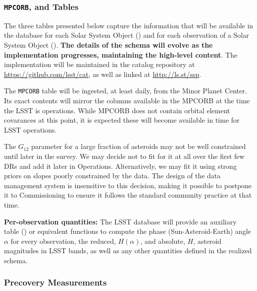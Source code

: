 \subsubsection{{\tt MPCORB}, \SSObject and \SSSource Tables}

The three tables presented below capture the information that will be available in the database for each Solar System Object (\SSObject) and for each observation of a Solar System Object (\SSSource). {\bf The details of the schema will evolve as the implementation progresses, maintaining the high-level content}. The implementation will be maintained in the catalog repository at \url{https://github.com/lsst/cat}, as well as linked at \url{http://ls.st/ssp}.




The {\tt MPCORB} table will be ingested, at least daily, from the Minor Planet Center. Its exact contents will mirror the columns available in the MPCORB at the time the LSST is operations. While MPCORB does not contain orbital element covarances at this point, it is expected these will become available in time for LSST operations.



The $G_{12}$ parameter for a large fraction of asteroids may not be well constrained until later in the survey. We may decide not to fit for it at all over the first few DRs and add it later in Operations. Alternatively, we may fit it using strong priors on slopes poorly constrained by the data. The design of the data management system is insensitive to this decision, making it possible to postpone it to Commissioning to ensure it follows the standard community practice at that time.

{\bf Per-observation quantities:} The LSST database will provide an auxiliary table (\SSSource) or equivalent functions to compute the phase (Sun-Asteroid-Earth) angle $\alpha$ for every observation, the reduced, $H(\alpha)$, and absolute, $H$, asteroid magnitudes in LSST bands, as well as any other quantities defined in the realized schema.



\subsubsection{Precovery Measurements}

